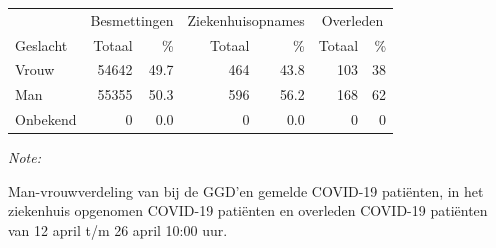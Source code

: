 \documentclass[
  english,
  man,floatsintext]{apa6}
\begin{document}
\begin{table}
\centering\begingroup\fontsize{11}{13}\selectfont

\begin{threeparttable}
\begin{tabular}{lrrrrrr}
\toprule
\multicolumn{1}{c}{ } & \multicolumn{2}{c}{Besmettingen} & \multicolumn{2}{c}{Ziekenhuisopnames} & \multicolumn{2}{c}{Overleden} \\
\cmidrule(l{3pt}r{3pt}){2-3} \cmidrule(l{3pt}r{3pt}){4-5} \cmidrule(l{3pt}r{3pt}){6-7}
Geslacht & Totaal & \% & Totaal & \% & Totaal & \%\\
\midrule
Vrouw & 54642 & 49.7 & 464 & 43.8 & 103 & 38\\
Man & 55355 & 50.3 & 596 & 56.2 & 168 & 62\\
Onbekend & 0 & 0.0 & 0 & 0.0 & 0 & 0\\
\bottomrule
\end{tabular}
\begin{tablenotes}
\item \textit{Note: } 
\item Man-vrouwverdeling van bij de GGD’en gemelde COVID-19 patiënten, in het ziekenhuis opgenomen COVID-19 patiënten en overleden COVID-19 patiënten van 12 april t/m 26 april 10:00 uur.
\end{tablenotes}
\end{threeparttable}
\endgroup{}
\end{table}
\newpage
\end{document}
